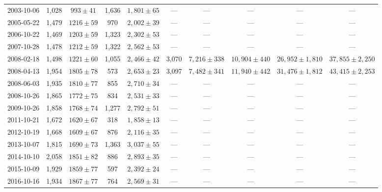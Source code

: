 \begin{landscape}
\begin{longtable}{cccccccccc}
{2003-10-06} & 1,028 & {$993  \pm  41$} & 1,636 & {$1,801 \pm 65$} & --- & --- & --- & --- & --- \\
{2005-05-22} & 1,479 & {$1216  \pm  59$} & 970 & {$2,002 \pm 39$} & --- & --- & --- & --- & --- \\
{2006-10-22} & 1,469 & {$1203  \pm  59$} & 1,323 & {$2,302 \pm 53$} & --- & --- & --- & --- & --- \\
{2007-10-28} & 1,478 & {$1212  \pm  59$} & 1,322 & {$2,562 \pm 53$} & --- & --- & --- & --- & --- \\
{2008-02-18} & 1,498 & {$1221  \pm  60$} & 1,055 & {$2,466 \pm 42$} & 3,070 & {$7,216 \pm 338$} & {$10,904 \pm 440$} & {$26,952 \pm 1,810$} & {$37,855 \pm 2,250$} \\
{2008-04-13} & 1,954 & {$1805  \pm  78$} & 573 & {$2,653 \pm 23$} & 3,097 & {$7,482 \pm 341$} & {$11,940 \pm 442$} & {$31,476 \pm 1,812$} & {$43,415 \pm 2,253$} \\
{2008-06-03} & 1,935 & {$1810  \pm  77$} & 855 & {$2,710 \pm 34$} & --- & --- & --- & --- & --- \\
{2008-10-26} & 1,865 & {$1772  \pm  75$} & 834 & {$2,531 \pm 33$} & --- & --- & --- & --- & --- \\
{2009-10-26} & 1,858 & {$1768  \pm  74$} & 1,277 & {$2,792 \pm 51$} & --- & --- & --- & --- & --- \\
{2011-10-21} & 1,672 & {$1620  \pm  67$} & 318 & {$1,858 \pm 13$} & --- & --- & --- & --- & --- \\
{2012-10-19} & 1,668 & {$1609  \pm  67$} & 876 & {$2,116 \pm 35$} & --- & --- & --- & --- & --- \\
{2013-10-07} & 1,815 & {$1690  \pm  73$} & 1,363 & {$3,037 \pm 55$} & --- & --- & --- & --- & --- \\
{2014-10-10} & 2,058 & {$1851  \pm  82$} & 886 & {$2,893 \pm 35$} & --- & --- & --- & --- & --- \\
{2015-10-09} & 1,929 & {$1859  \pm  77$} & 597 & {$2,392 \pm 24$} & --- & --- & --- & --- & --- \\
{2016-10-16} & 1,934 & {$1867  \pm  77$} & 764 & {$2,569 \pm 31$} & --- & --- & --- & --- & --- \\
\end{longtable} 
\end{landscape} 
